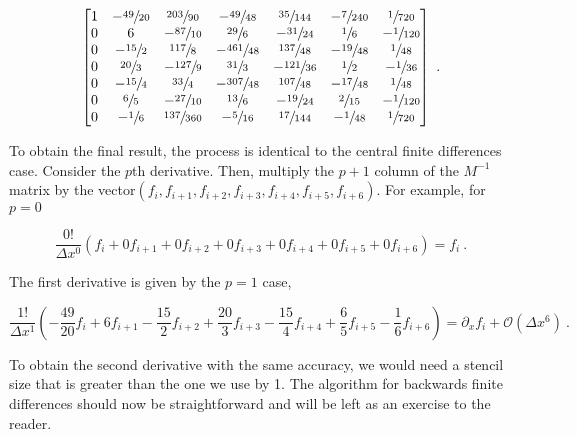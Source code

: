 \documentclass[a4paper,11pt]{article}
\begin{document}
\begin{equation}
\left[
\begin{matrix}
1 & - \sfrac{49}{20} & \sfrac{203}{90} & - \sfrac{49}{48} & \sfrac{35}{144} & - \sfrac{7}{240} & \sfrac{1}{720}\\0 & 6 & - \sfrac{87}{10} & \sfrac{29}{6} & - \sfrac{31}{24} & \sfrac{1}{6} & - \sfrac{1}{120}\\0 & - \sfrac{15}{2} & \sfrac{117}{8} & - \sfrac{461}{48} & \sfrac{137}{48} & - \sfrac{19}{48} & \sfrac{1}{48}\\0 & \sfrac{20}{3} & - \sfrac{127}{9} & \sfrac{31}{3} & - \sfrac{121}{36} & \sfrac{1}{2} & - \sfrac{1}{36}\\0 & - \sfrac{15}{4} & \sfrac{33}{4} & - \sfrac{307}{48} & \sfrac{107}{48} & - \sfrac{17}{48} & \sfrac{1}{48}\\0 & \sfrac{6}{5} & - \sfrac{27}{10} & \sfrac{13}{6} & - \sfrac{19}{24} & \sfrac{2}{15} & - \sfrac{1}{120}\\0 & - \sfrac{1}{6} & \sfrac{137}{360} & - \sfrac{5}{16} & \sfrac{17}{144} & - \sfrac{1}{48} & \sfrac{1}{720}
\end{matrix}
\right]\ .
\end{equation}

To obtain the final result, the process is identical to the central finite differences case. Consider the $p$th derivative. Then, multiply the $p+1$ column of the $M^{-1}$ matrix by the vector\linebreak$\left(f_{i},f_{i+1},f_{i+2},f_{i+3},f_{i+4},f_{i+5},f_{i+6}\right)$. For example, for $p=0$

\begin{equation}
\frac{0!}{\Delta x^{0}}\left(f_{i} + 0f_{i+1} + 0f_{i+2} + 0f_{i+3} + 0f_{i+4} + 0f_{i+5} + 0f_{i+6}\right) = f_{i}\ .
\end{equation}

The first derivative is given by the $p=1$ case,

\begin{equation}
\frac{1!}{\Delta x^{1}}\left(-\frac{49}{20}f_{i} + 6f_{i+1}  -\frac{15}{2}f_{i+2} + \frac{20}{3}f_{i+3} - \frac{15}{4}f_{i+4} + \frac{6}{5}f_{i+5} - \frac{1}{6}f_{i+6}\right) = \partial_{x}f_{i} + \mathcal{O}\left(\Delta x^{6}\right)\ .
\end{equation}

To obtain the second derivative with the same accuracy, we would need a stencil size that is greater than the one we use by 1. The algorithm for backwards finite differences should now be straightforward and will be left as an exercise to the reader.
\end{document}
